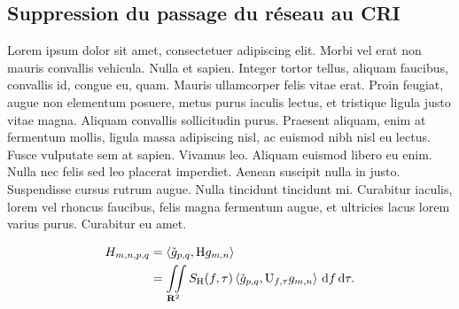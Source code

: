 \subsection{Suppression du passage du réseau au CRI}
Lorem ipsum dolor sit amet, consectetuer adipiscing elit. Morbi vel erat non mauris convallis vehicula. Nulla et sapien. Integer tortor tellus, aliquam faucibus, convallis id, congue eu, quam. Mauris ullamcorper felis vitae erat. Proin feugiat, augue non elementum posuere, metus purus iaculis lectus, et tristique ligula justo vitae magna. Aliquam convallis sollicitudin purus. Praesent aliquam, enim at fermentum mollis, ligula massa adipiscing nisl, ac euismod nibh nisl eu lectus. Fusce vulputate sem at sapien. Vivamus leo. Aliquam euismod libero eu enim. Nulla nec felis sed leo placerat imperdiet. Aenean suscipit nulla in justo. Suspendisse cursus rutrum augue. Nulla tincidunt tincidunt mi. Curabitur iaculis, lorem vel rhoncus faucibus, felis magna fermentum augue, et ultricies lacus lorem varius purus. Curabitur eu amet.

\begin{align}
H_{m,n,p,q} &= \left \langle \check{g}_{p,q},\mathrm{H} g_{m,n} \right \rangle\\
&= \iint\limits_{\mathbf{R}^2} S_{\mathrm{H}}(f,\tau) \left \langle \check{g}_{p,q},\mathrm{U}_{f,\tau} g_{m,n} \right \rangle \, \mathrm{d} f \, \mathrm{d} \tau.
\end{align}

